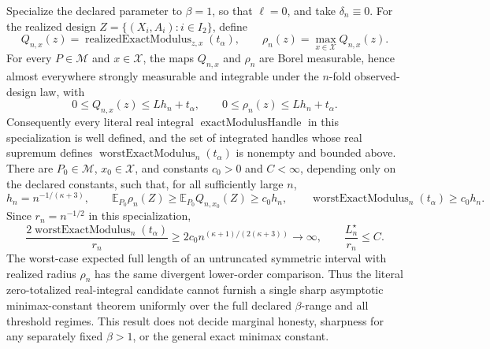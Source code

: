 Specialize the declared parameter to \(\beta=1\), so that \(\ell=0\), and take \(\delta_n\equiv0\).  For the realized design \(Z=\{(X_i,A_i):i\in I_2\}\), define
\[
Q_{n,x}(z)=\operatorname{realizedExactModulus}_{z,x}(t_\alpha),
\qquad
\rho_n(z)=\max_{x\in\mathcal X}Q_{n,x}(z).
\]
For every \(P\in\mathcal M\) and \(x\in\mathcal X\), the maps \(Q_{n,x}\) and \(\rho_n\) are Borel measurable, hence almost everywhere strongly measurable and integrable under the \(n\)-fold observed-design law, with
\[
0\leq Q_{n,x}(z)\leq Lh_n+t_\alpha,
\qquad
0\leq\rho_n(z)\leq Lh_n+t_\alpha.
\]
Consequently every literal real integral \(\operatorname{exactModulusHandle}\) in this specialization is well defined, and the set of integrated handles whose real supremum defines \(\operatorname{worstExactModulus}_n(t_\alpha)\) is nonempty and bounded above.  There are \(P_0\in\mathcal M\), \(x_0\in\mathcal X\), and constants \(c_0>0\) and \(C<\infty\), depending only on the declared constants, such that, for all sufficiently large \(n\),
\[
h_n=n^{-1/(\kappa+3)},
\qquad
\mathbb E_{P_0}\rho_n(Z)\geq
\mathbb E_{P_0}Q_{n,x_0}(Z)\geq c_0h_n,
\qquad
\operatorname{worstExactModulus}_n(t_\alpha)\geq c_0h_n.
\]
Since \(r_n=n^{-1/2}\) in this specialization,
\[
\frac{2\operatorname{worstExactModulus}_n(t_\alpha)}{r_n}
\geq2c_0n^{(\kappa+1)/(2(\kappa+3))}\longrightarrow\infty,
\qquad
\frac{L_n^\star}{r_n}\leq C.
\]
The worst-case expected full length of an untruncated symmetric interval with realized radius \(\rho_n\) has the same divergent lower-order comparison.  Thus the literal zero-totalized real-integral candidate cannot furnish a single sharp asymptotic minimax-constant theorem uniformly over the full declared \(\beta\)-range and all threshold regimes.  This result does not decide marginal honesty, sharpness for any separately fixed \(\beta>1\), or the general exact minimax constant.